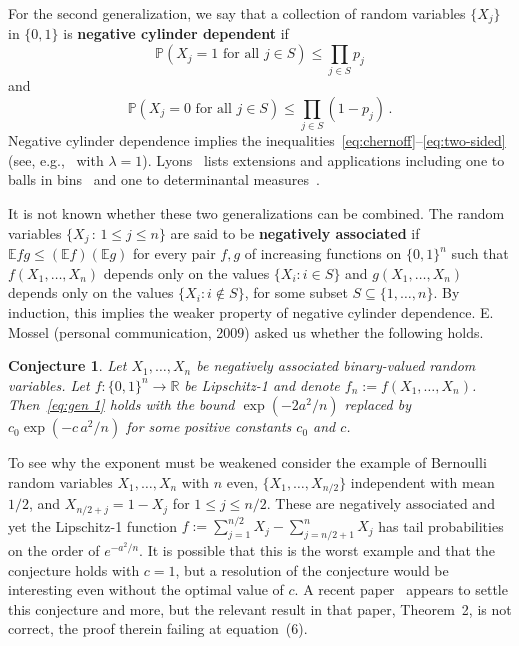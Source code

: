 \documentclass[10pt]{article}
\theoremstyle{plain}
\newtheorem{conj}[thm]{Conjecture}
\theoremstyle{remark}
\newcommand{\Em}[1]{\textbf{#1}}
\def\R{\mathbb{R}}
\def\E{{\mathbb E}}
\def\P{{\mathbb P}}
\begin{document}
For the second generalization, we say that a collection of
random variables $\{ X_j \}$ in $\{ 0 , 1 \}$ is
\Em{negative cylinder dependent} if
\begin{equation} \label{eq:cyl 1}
\P (X_j = 1 \mbox{ for all } j \in S) \leq \prod_{j \in S} p_j
\end{equation}
and
\begin{equation} \label{eq:cyl 2}
\P (X_j = 0 \mbox{ for all } j \in S) \leq \prod_{j \in S} (1 - p_j) \, .
\end{equation}
%
Negative cylinder dependence implies the
inequalities~\eqref{eq:chernoff}--\eqref{eq:two-sided} (see,
e.g.,~\cite[Theorem~3.4]{panconesi-srinivasan} with $\lambda = 1$).
Lyons~\cite[Section~6]{lyons03} lists extensions and applications
including one to balls in bins~\cite{dubhashi-ranjan} and one to
determinantal measures~\cite{soshnikov00}.

It is not known whether these two generalizations can be combined.
The random variables $\{ X_j \, : \, 1 \leq j \leq n \}$ are said to be
\Em{negatively associated} if $\E fg \leq (\E f) (\E g)$ for
every pair $f,g$ of increasing functions on $\{ 0 , 1 \}^n$ such that
$f (X_1 , \ldots , X_n)$ depends only on the values $\{ X_i : i \in S \}$
and $g (X_1 , \ldots , X_n)$ depends only on the values
$\{ X_i : i \notin S \}$, for some subset $S \subseteq \{ 1 ,
\ldots , n \}$.  By induction, this implies the weaker property
of negative cylinder dependence.  E. Mossel (personal communication, 2009)
asked us whether the following holds.
%
\begin{conj} \label{conj:both}
Let $X_1 , \ldots, X_n$ be negatively associated binary-valued
random variables.  Let $f : \{ 0,1 \}^n \to \R$ be Lipschitz-1
and denote $f_n := f(X_1 , \ldots , X_n)$.
Then~\eqref{eq:gen 1} holds with the bound $\exp (- 2 a^2 / n)$
replaced by $c_0 \exp (- c \, a^2 / n)$ for some positive
constants $c_0$ and $c$.
\end{conj}

To see why the exponent must be weakened consider the example
of Bernoulli random variables $X_1 , \ldots , X_n$ with
$n$ even, $\{ X_1 , \ldots , X_{n/2} \}$ independent with
mean $1/2$, and $X_{n/2 + j} = 1 - X_j$ for $1 \leq j \leq n/2$.
These are negatively associated and yet the Lipschitz-1 function
$f := \sum_{j=1}^{n/2} X_j - \sum_{j=n/2+1}^n X_j$ has tail
probabilities on the order of $e^{- a^2 / n}$.  It is
possible that this is the worst example and that the
conjecture holds with $c=1$, but a resolution of the conjecture
would be interesting even without the optimal value of $c$.
A recent paper~\cite{farc08} appears to settle this conjecture
and more, but the relevant result in that paper, Theorem~2,
is not correct, the proof therein failing at equation~(6).
\end{document}
